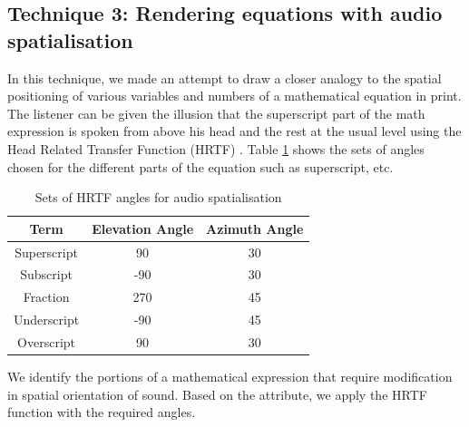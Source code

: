 \documentclass{article}
\begin{document}
\subsection{Technique 3: Rendering equations with audio spatialisation}
\label{ssec:t3}
In this technique, we made an attempt to draw a closer analogy to the spatial positioning of various variables and numbers of a mathematical equation in print. The listener can be given the illusion that the superscript part of the math expression is spoken from above his head and the rest at the usual level using the Head Related Transfer Function (HRTF) \cite{geronazzo2011head}.
Table 
\ref{table:hrtf} shows the sets of angles chosen for the different parts of the equation such as superscript, etc. 



\begin{table}[h]
\caption{Sets of HRTF angles for audio spatialisation}

\vspace{8pt} %

\centering
\begin{tabular}{| c | c | c |}
\hline%
Term & Elevation Angle & Azimuth Angle \\[0.5ex]
\hline
Superscript & 90 & 30  \\
Subscript & -90 & 30  \\
Fraction & 270 & 45  \\
Underscript & -90 & 45  \\
Overscript & 90 & 30\\ %
\hline


\end{tabular}
\label{table:hrtf}
\end{table}


We identify the portions of a mathematical expression that require modification in spatial orientation of sound. Based on the attribute, we apply the HRTF function with the required angles.
\end{document}
